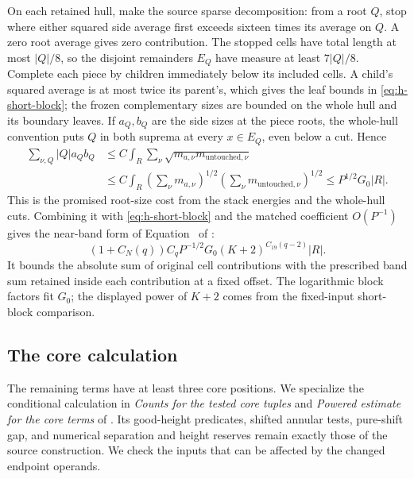 On each retained hull, make the source sparse decomposition:
from a root \(Q\), stop where either squared side average first
exceeds sixteen times its average on \(Q\).  A zero root average gives
zero contribution.  The stopped cells
have total length at most \(|Q|/8\), so the disjoint remainders
\(E_Q\) have measure at least \(7|Q|/8\).  Complete each piece
by children immediately below its included cells.  A child's
squared average is at most twice its parent's, which gives the
leaf bounds in \eqref{eq:h-short-block}; the frozen complementary
sizes are bounded on the whole hull and its boundary leaves.
If \(a_Q,b_Q\) are the side sizes at the piece roots, the
whole-hull convention puts \(Q\) in both suprema at every
\(x\in E_Q\), even below a cut.  Hence
\[
 \begin{split}
 \sum_{\nu,Q}|Q|a_Qb_Q
 &\le C\int_R\sum_\nu\sqrt{m_{a,\nu}m_{\mathrm{untouched},\nu}}\\
 &\le C\int_R
       \left(\sum_\nu m_{a,\nu}\right)^{1/2}
       \left(\sum_\nu m_{\mathrm{untouched},\nu}\right)^{1/2}
 \le P^{1/2}G_0|R|.
 \end{split}
\]
This is the promised root-size cost from the stack energies and
the whole-hull cuts.  Combining it with
\eqref{eq:h-short-block} and the matched coefficient \(O(P^{-1})\)
gives the near-band form of Equation~ of
\cite[Section~7]{H}:
\begin{equation}
 (1+C_N(q))C_qP^{-1/2}G_0
                  (K+2)^{C_{19}(q-2)}|R|.
 \label{eq:h-near-band}
\end{equation}
It bounds the absolute sum of original cell contributions with
the prescribed band sum retained inside each contribution at a
fixed offset.  The logarithmic block factors fit \(G_0\); the
displayed power of \(K+2\) comes from the fixed-input
short-block comparison.

\subsection{The core calculation}

The remaining terms have at least three core positions.  We
specialize the conditional calculation in
\emph{Counts for the tested core tuples} and
\emph{Powered estimate for the core terms} of
\cite[Section~9]{H}.  Its good-height predicates, shifted
annular tests, pure-shift gap, and numerical separation and
height reserves remain exactly those of the source construction.
We check the inputs that can be affected by the changed endpoint
operands.


